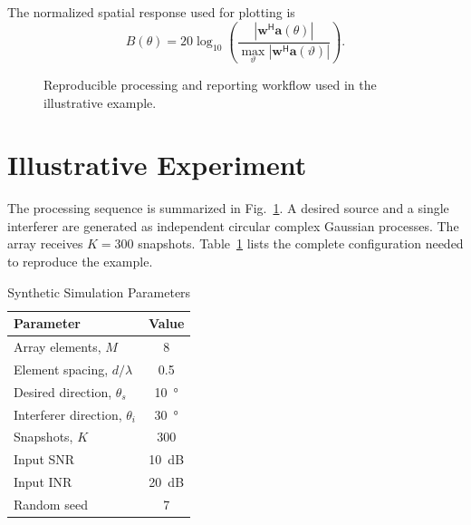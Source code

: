 \documentclass[conference]{IEEEtran}
\begin{document}
The normalized spatial response used for plotting is
\begin{equation}
B(\theta)
=
20\log_{10}
\left(
\frac{|\mathbf{w}^{\mathsf{H}}\mathbf{a}(\theta)|}
{\max_{\vartheta}|\mathbf{w}^{\mathsf{H}}\mathbf{a}(\vartheta)|}
\right).
\label{eq:beam_pattern}
\end{equation}

\begin{figure}[t]
\centering
{}
\caption{Reproducible processing and reporting workflow used in the illustrative example.}
\label{fig:workflow}
\end{figure}

\section{Illustrative Experiment}
The processing sequence is summarized in Fig.~\ref{fig:workflow}. A desired source and a single interferer are generated as independent circular complex Gaussian processes. The array receives $K=300$ snapshots. Table~\ref{tab:simulation_parameters} lists the complete configuration needed to reproduce the example.

\begin{table}[t]
\caption{Synthetic Simulation Parameters}
\label{tab:simulation_parameters}
\centering
\begin{tabular}{@{}lc@{}}
\toprule
Parameter & Value \\
\midrule
Array elements, $M$ & 8 \\
Element spacing, $d/\lambda$ & 0.5 \\
Desired direction, $\theta_s$ & \SI{10}{\degree} \\
Interferer direction, $\theta_i$ & \SI{30}{\degree} \\
Snapshots, $K$ & 300 \\
Input SNR & \SI{10}{dB} \\
Input INR & \SI{20}{dB} \\
Random seed & 7 \\
\bottomrule
\end{tabular}
\end{table}
\end{document}
